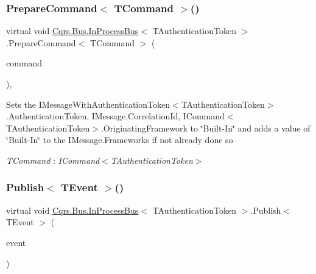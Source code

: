 \subsubsection{\texorpdfstring{Prepare\+Command$<$ T\+Command $>$()}{PrepareCommand< TCommand >()}}
{\footnotesize\ttfamily virtual void \hyperlink{classCqrs_1_1Bus_1_1InProcessBus}{Cqrs.\+Bus.\+In\+Process\+Bus}$<$ T\+Authentication\+Token $>$.Prepare\+Command$<$ T\+Command $>$ (\begin{DoxyParamCaption}\item[{T\+Command}]{command }\end{DoxyParamCaption})\hspace{0.3cm}{\ttfamily [protected]}, {\ttfamily [virtual]}}



Sets the I\+Message\+With\+Authentication\+Token$<$\+T\+Authentication\+Token$>$.\+Authentication\+Token, I\+Message.\+Correlation\+Id, I\+Command$<$\+T\+Authentication\+Token$>$.\+Originating\+Framework to \char`\"{}\+Built-\/\+In\char`\"{} and adds a value of \char`\"{}\+Built-\/\+In\char`\"{} to the I\+Message.\+Frameworks if not already done so 

\begin{Desc}
\item[Type Constraints]\begin{description}
\item[{\em T\+Command} : {\em I\+Command$<$T\+Authentication\+Token$>$}]\end{description}
\end{Desc}
\mbox{\label{classCqrs_1_1Bus_1_1InProcessBus_afd3d41a5f27a985e9d6ccf3f6f77f11a}} 
\subsubsection{\texorpdfstring{Publish$<$ T\+Event $>$()}{Publish< TEvent >()}\hspace{0.1cm}{\footnotesize\ttfamily [1/2]}}
{\footnotesize\ttfamily virtual void \hyperlink{classCqrs_1_1Bus_1_1InProcessBus}{Cqrs.\+Bus.\+In\+Process\+Bus}$<$ T\+Authentication\+Token $>$.Publish$<$ T\+Event $>$ (\begin{DoxyParamCaption}\item[{T\+Event @}]{event }\end{DoxyParamCaption})\hspace{0.3cm}{\ttfamily [virtual]}}




